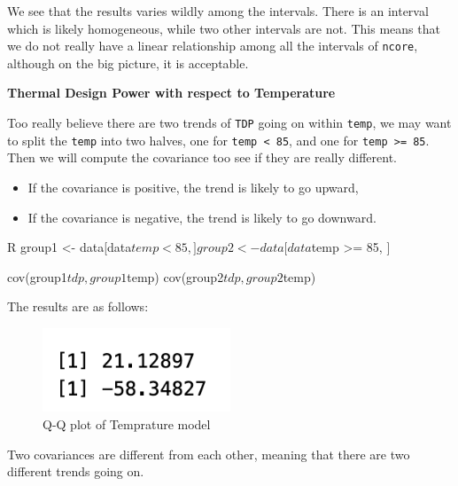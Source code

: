 We see that the results varies wildly among the intervals. There is an interval which is likely homogeneous, while two other intervals are not.
This means that we do not really have a linear relationship among all the intervals of \verb|ncore|, although on the big picture, it is acceptable.









\textbf{Thermal Design Power with respect to Temperature}

Too really believe there are two trends of \verb|TDP| going on within \verb|temp|, we may want to split the \verb|temp| into
two halves, one for \verb|temp < 85|, and one for \verb|temp >= 85|. Then we will compute the covariance too see if they are really
different.

\begin{itemize}
    \item If the covariance is positive, the trend is likely to go upward,
    \item If the covariance is negative, the trend is likely to go downward.
\end{itemize}

\begin{code}{R}
    group1 <- data[data$temp < 85, ]
    group2 <- data[data$temp >= 85, ]

    cov(group1$tdp, group1$temp)
    cov(group2$tdp, group2$temp)
\end{code}

The results are as follows:
\begin{figure}[H]
    \centering
    \includegraphics[width=0.5\textwidth]{./graphics/anova_temp_cov.png}
    \caption{Q-Q plot of Temprature model}
    \label{fig:anova_temp_cov}
\end{figure}

Two covariances are different from each other, meaning that there are two different trends going on.
























